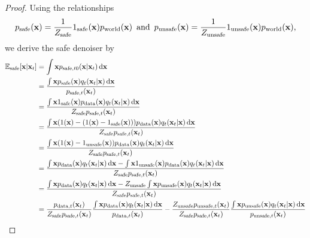 \begin{proof}
Using the relationships
\begin{align*}
    p_{\text{safe}}(\mathbf{x})= \frac{1}{Z_\text{safe}}1_{\text{safe}}(\mathbf{x}) p_{\text{world}}(\mathbf{x}) \text{\, and\, } p_{\text{unsafe}}(\mathbf{x})= \frac{1}{Z_\text{unsafe}}1_{\text{unsafe}}(\mathbf{x}) p_{\text{world}}(\mathbf{x}),
\end{align*}
we derive the safe denoiser by
\begin{align*}
    \mathbb{E}_{\text{safe}}[\mathbf{x}\vert\mathbf{x}_{t}]&=\int\mathbf{x}p_{\text{safe},t0}(\mathbf{x}\vert\mathbf{x}_{t})\diff\mathbf{x}\\
    &=\frac{\int\mathbf{x}p_{\text{safe}}(\mathbf{x})q_{t}(\mathbf{x}_{t}\vert\mathbf{x})\diff\mathbf{x}}{p_{\text{safe},t}(\mathbf{x}_{t})}\\
    &=\frac{\int\mathbf{x}1_{\text{safe}}(\mathbf{x})p_{\text{data}}(\mathbf{x})q_{t}(\mathbf{x}_{t}\vert\mathbf{x})\diff\mathbf{x}}{Z_{\text{safe}}p_{\text{safe},t}(\mathbf{x}_{t})}\\
    &=\frac{\int\mathbf{x}(1(\mathbf{x})-(1(\mathbf{x})-1_{\text{safe}}(\mathbf{x})))p_{\text{data}}(\mathbf{x})q_{t}(\mathbf{x}_{t}\vert\mathbf{x})\diff\mathbf{x}}{Z_{\text{safe}}p_{\text{safe},t}(\mathbf{x}_{t})}\\
    &=\frac{\int\mathbf{x}(1(\mathbf{x})-1_{\text{unsafe}}(\mathbf{x}))p_{\text{data}}(\mathbf{x})q_{t}(\mathbf{x}_{t}\vert\mathbf{x})\diff\mathbf{x}}{Z_{\text{safe}}p_{\text{safe},t}(\mathbf{x}_{t})}\\
    &=\frac{\int\mathbf{x}p_{\text{data}}(\mathbf{x})q_{t}(\mathbf{x}_{t}\vert\mathbf{x})\diff\mathbf{x}-\int\mathbf{x}1_{\text{unsafe}}(\mathbf{x})p_{\text{data}}(\mathbf{x})q_{t}(\mathbf{x}_{t}\vert\mathbf{x})\diff\mathbf{x}}{Z_{\text{safe}}p_{\text{safe},t}(\mathbf{x}_{t})}\\
    &=\frac{\int\mathbf{x}p_{\text{data}}(\mathbf{x})q_{t}(\mathbf{x}_{t}\vert\mathbf{x})\diff\mathbf{x}-Z_{\text{unsafe}}\int\mathbf{x}p_{\text{unsafe}}(\mathbf{x})q_{t}(\mathbf{x}_{t}\vert\mathbf{x})\diff\mathbf{x}}{Z_{\text{safe}}p_{\text{safe},t}(\mathbf{x}_{t})}\\
    &=\frac{p_{\text{data},t}(\mathbf{x}_{t})}{Z_{\text{safe}}p_{\text{safe},t}(\mathbf{x}_{t})}\frac{\int\mathbf{x}p_{\text{data}}(\mathbf{x})q_{t}(\mathbf{x}_{t}\vert\mathbf{x})\diff\mathbf{x}}{p_{\text{data},t}(\mathbf{x}_{t})}-\frac{Z_{\text{unsafe}}p_{\text{unsafe},t}(\mathbf{x}_{t})}{Z_{\text{safe}}p_{\text{safe},t}(\mathbf{x}_{t})}\frac{\int\mathbf{x}p_{\text{unsafe}}(\mathbf{x})q_{t}(\mathbf{x}_{t}\vert\mathbf{x})\diff\mathbf{x}}{p_{\text{unsafe},t}(\mathbf{x}_{t})}\\

\end{align*}
\end{proof}
